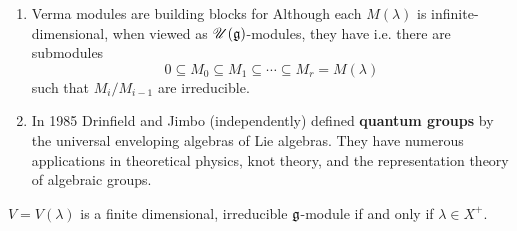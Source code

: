 \documentclass{article}
\begin{document}
\begin{remark*}\hspace{0.1cm}
    \begin{enumerate}
        \item Verma modules are building blocks for  Although each $M(\lambda)$ is infinite-dimensional, when viewed as $\mathscr{U}(\mathfrak{g})$-modules, they have  i.e. there are submodules \[ 0 \subseteq M_{0} \subseteq M_{1} \subseteq \cdots \subseteq M_{r} = M(\lambda)\] such that $M_{i}/M_{i-1}$ are irreducible.
        \item In 1985 Drinfield and Jimbo (independently) defined \textbf{quantum groups} by  the universal enveloping algebras of Lie algebras. They have numerous applications in theoretical physics, knot theory, and the representation theory of algebraic groups.
    \end{enumerate}
\end{remark*}
\begin{fancythm}{}
    $V = V(\lambda)$ is a finite dimensional, irreducible $\mathfrak{g}$-module if and only if $\lambda \in X^{+}$.
\end{fancythm}
\proof \hspace{0.1cm}
\end{document}
